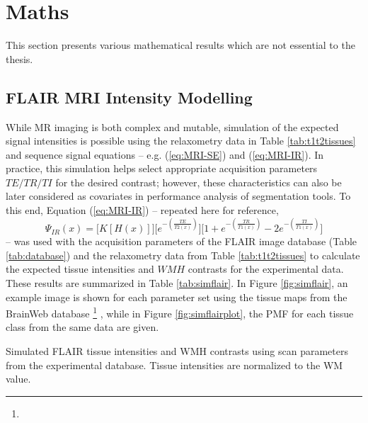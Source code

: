 \chapter{Maths}
This section presents various mathematical results which are not essential to the thesis.
\section{FLAIR MRI Intensity Modelling}\label{s:simflair}
While MR imaging is both complex and mutable, simulation of the expected signal intensities is possible using the relaxometry data in Table \ref{tab:t1t2tissues} and sequence signal equations -- e.g. (\ref{eq:MRI-SE}) and (\ref{eq:MRI-IR}).
In practice, this simulation helps select appropriate acquisition parameters $TE/TR/TI$ for the desired contrast;
however, these characteristics can also be later considered as covariates in performance analysis of segmentation tools.
To this end, Equation (\ref{eq:MRI-IR}) -- repeated here for reference,
\begin{equation}
\Psi_{IR}(x) = \bigg[K \left[H(x)\right]\bigg]\bigg[e^{-\left(\frac{TE}{T2(x)}\right)}\bigg]\bigg[1 + e^{-\left(\frac{TR}{T1(x)}\right)} - 2e^{-\left(\frac{TI}{T1(x)}\right)}\bigg]
\end{equation}
-- was used with the acquisition parameters of the FLAIR image database (Table \ref{tab:database}) and the relaxometry data from Table \ref{tab:t1t2tissues} to calculate the expected tissue intensities and $WMH$ contrasts for the experimental data.
These results are summarized in Table \ref{tab:simflair}.
In Figure \ref{fig:simflair}, an example image is shown for each parameter set using the tissue maps from the BrainWeb database \cite{Collins1998}%
\footnote{}%
, while in Figure \ref{fig:simflairplot}, the PMF for each tissue class from the same data are given.
\begin{table}
  \centering
  \caption{Simulated FLAIR tissue intensities and WMH contrasts using scan parameters from the experimental database. Tissue intensities are normalized to the WM value.}
  \label{tab:simflair}
  
\end{table}
